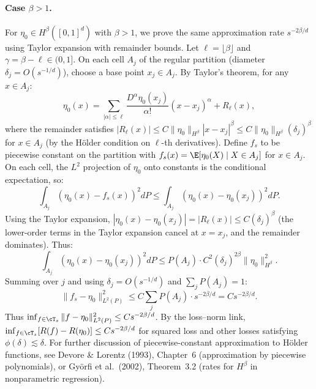 %



\paragraph{Case $\beta > 1$.}
For $\eta_0 \in H^\beta([0,1]^d)$ with $\beta > 1$, we prove the same approximation rate $s^{-2\beta/d}$ using Taylor expansion with remainder bounds. Let $\ell = \lfloor \beta \rfloor$ and $\gamma = \beta - \ell \in (0,1]$. On each cell $A_j$ of the regular partition (diameter $\delta_j = O(s^{-1/d})$), choose a base point $x_j \in A_j$. By Taylor's theorem, for any $x \in A_j$:
\[
\eta_0(x) = \sum_{|\alpha| \le \ell} \frac{D^\alpha \eta_0(x_j)}{\alpha!} (x - x_j)^\alpha + R_\ell(x),
\]
where the remainder satisfies $|R_\ell(x)| \le C \|\eta_0\|_{H^\beta} |x - x_j|^\beta \le C \|\eta_0\|_{H^\beta} (\delta_j)^\beta$ for $x \in A_j$ (by the Hölder condition on $\ell$-th derivatives). Define $f_s$ to be piecewise constant on the partition with $f_s(x) = \E[\eta_0(X) \mid X \in A_j]$ for $x \in A_j$. On each cell, the $L^2$ projection of $\eta_0$ onto constants is the conditional expectation, so:
\[
\int_{A_j} (\eta_0(x) - f_s(x))^2 dP \le \int_{A_j} (\eta_0(x) - \eta_0(x_j))^2 dP.
\]
Using the Taylor expansion, $|\eta_0(x) - \eta_0(x_j)| = |R_\ell(x)| \le C(\delta_j)^\beta$ (the lower-order terms in the Taylor expansion cancel at $x = x_j$, and the remainder dominates). Thus:
\[
\int_{A_j} (\eta_0(x) - \eta_0(x_j))^2 dP \le P(A_j) \cdot C^2 (\delta_j)^{2\beta} \|\eta_0\|_{H^\beta}^2.
\]
Summing over $j$ and using $\delta_j = O(s^{-1/d})$ and $\sum_j P(A_j) = 1$:
\[
\|f_s - \eta_0\|_{L^2(P)}^2 \le C \sum_j P(A_j) \cdot s^{-2\beta/d} = C s^{-2\beta/d}.
\]
Thus $\inf_{f \in \cT_s} \|f - \eta_0\|_{L^2(P)}^2 \le C s^{-2\beta/d}$. By the loss--norm link, $\inf_{f \in \cT_s} [R(f) - R(\eta_0)] \le C s^{-2\beta/d}$ for squared loss and other losses satisfying $\phi(\delta) \lesssim \delta$. For further discussion of piecewise-constant approximation to Hölder functions, see Devore \& Lorentz (1993), Chapter~6 (approximation by piecewise polynomials), or Györfi et al.\ (2002), Theorem~3.2 (rates for $H^\beta$ in nonparametric regression).


